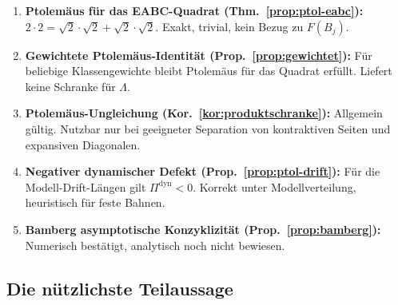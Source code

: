 \documentclass[12pt,a4paper]{article}
\newcommand{\Ptol}{\Pi}             %
\begin{document}
\begin{tcolorbox}[ergebnis, title={Rigorose Aussagen}]
\begin{enumerate}[label=\upshape(\arabic*), leftmargin=*]
  \item \textbf{Ptolemäus für das EABC-Quadrat (Thm.~\ref{prop:ptol-eabc}):}
    $2 \cdot 2 = \sqrt{2}\cdot\sqrt{2} + \sqrt{2}\cdot\sqrt{2}$.
    Exakt, trivial, kein Bezug zu $F(B_j)$.

  \item \textbf{Gewichtete Ptolemäus-Identität (Prop.~\ref{prop:gewichtet}):}
    Für beliebige Klassengewichte bleibt Ptolemäus für das Quadrat erfüllt.
    Liefert keine Schranke für $\Lambda$.

  \item \textbf{Ptolemäus-Ungleichung (Kor.~\ref{kor:produktschranke}):}
    Allgemein gültig. Nutzbar nur bei geeigneter Separation von
    kontraktiven Seiten und expansiven Diagonalen.

  \item \textbf{Negativer dynamischer Defekt (Prop.~\ref{prop:ptol-drift}):}
    Für die Modell-Drift-Längen gilt $\Ptol^{\mathrm{dyn}} < 0$.
    Korrekt unter Modellverteilung, heuristisch für feste Bahnen.

  \item \textbf{Bamberg asymptotische Konzyklizität (Prop.~\ref{prop:bamberg}):}
    Numerisch bestätigt, analytisch noch nicht bewiesen.
\end{enumerate}
\end{tcolorbox}

\subsection{Die nützlichste Teilaussage}
\end{document}
